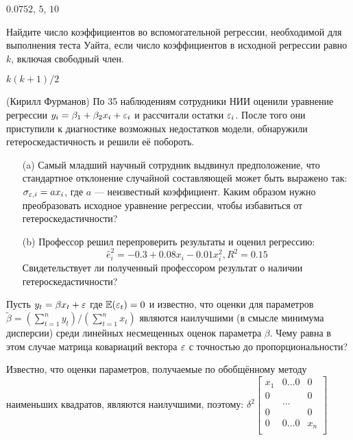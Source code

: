 \documentclass[pdftex,11pt,openany]{book}\usepackage[]{graphicx}\usepackage[]{color}
\begin{document}
\begin{solution}
$0.0752$, $5$, $10$
\end{solution}

\begin{problem}
Найдите число коэффициентов во вспомогательной регрессии, необходимой для выполнения теста Уайта, если число коэффициентов в исходной регрессии равно $k$, включая свободный член.
\end{problem}

\begin{solution}
$k(k+1)/2$
\end{solution}

\begin{problem} 
(Кирилл Фурманов) По 35 наблюдениям сотрудники НИИ оценили уравнение регрессии $y_i = \beta_1 + \beta_2 x_i + \varepsilon_i$ и рассчитали остатки $\varepsilon_i$. После того они приступили к диагностике возможных недостатков модели, обнаружили гетероскедастичность и решили её побороть.
\begin{enumerate}
\item[(a)] Самый младший научный сотрудник выдвинул предположение, что стандартное отклонение случайной составляющей может быть выражено так: $\sigma_{\varepsilon, i} = a x_i$, где $a$ --– неизвестный коэффициент. Каким образом нужно преобразовать исходное уравнение регрессии, чтобы избавиться от гетероскедастичности?
\item[(b)] Профессор решил перепроверить результаты и оценил регрессию: 
$$\hat{e}_i^2 = -0.3 + 0.08 x_i - 0.01 x_i^2, R^2 = 0.15$$
Свидетельствует ли полученный профессором результат о наличии гетероскедастичности?
\end{enumerate}
\end{problem}

\begin{solution}
\end{solution}


\begin{problem}
 Пусть $y_t = \beta x_t + \varepsilon$ где $\mathbb{E}(\varepsilon_t) = 0$ и известно, что оценки для параметров $\tilde{\beta} = \left( \sum_{t=1}^n y_t \right)/\left( \sum_{t=1}^n x_t \right)$ являются наилучшими (в смысле минимума дисперсии) среди линейных несмещенных оценок параметра $\beta$. Чему равна в этом случае матрица ковариаций вектора $\varepsilon$ с точностью до пропорциональности?
\end{problem}


\begin{solution}
Известно, что оценки параметров, получаемые по обобщённому методу наименьших квадратов, являются наилучшими, поэтому:
$\delta^2 \begin{bmatrix}
x_1 & 0\ldots0 & 0 \\
0 &  & 0 \\
  & \ldots & \\
0 &  & 0 \\
0 & 0\ldots0 & x_n \\
\end{bmatrix}$
\end{solution}
\end{document}
